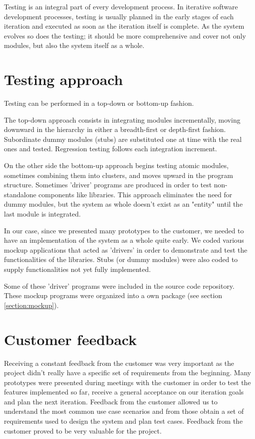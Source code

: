 
Testing is an integral part of every development process.
In iterative software development processes, testing is usually planned in the
early stages of each iteration and executed as soon as the iteration itself is
complete. As the system evolves so does the testing; it should be more
comprehensive and cover not only modules, but also the system itself as a whole.

\section{Testing approach}
Testing can be performed in a top-down or bottom-up fashion.

The top-down approach consists in integrating modules incrementally, moving
downward in the hierarchy in either a breadth-first or depth-first fashion. \newline
Subordinate dummy modules (stubs) are substituted one at time with the real ones
and tested. Regression testing follows each integration increment.

On the other side the bottom-up approach begins testing atomic modules,
sometimes combining them into clusters, and moves upward in the program
structure. Sometimes 'driver' programs are produced in order to test \newline
non-standalone components like libraries. This approach eliminates the need for
dummy modules, but the system as whole doesn't exist as an "entity" until the
last module is integrated.

In our case, since we presented many prototypes to the customer, we needed to
have an implementation of the system as a whole quite early. We coded various
mockup applications that acted as 'drivers' in order to demonstrate and test the
functionalities of the libraries. Stubs (or dummy modules) were also coded
to supply functionalities not yet fully implemented.

Some of these 'driver' programs were included in the source code repository. 
These mockup programs were organized into a own package (see section \ref{section:mockup}).

\section{Customer feedback}
Receiving a constant feedback from the customer was very important as the
project didn't really have a specific set of requirements from the beginning.
Many prototypes were presented during meetings with the customer in order to
test the features implemented so far, receive a general acceptance on our
iteration goals and plan the next iteration. Feedback from the customer
allowed us to understand the most common use case scenarios and from those
obtain a set of requirements used to design the system and plan test cases.
Feedback from the customer proved to be very valuable for the project.

